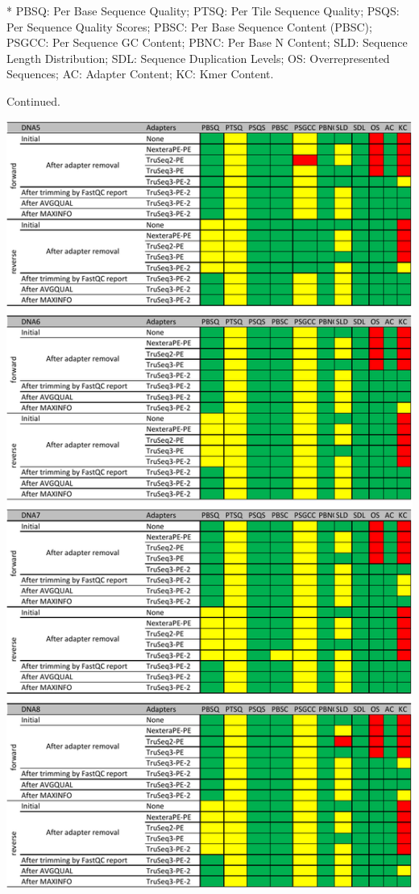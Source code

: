 \documentclass[
  oneside,
  11pt, a4paper,
  footinclude=true,
  headinclude=true,
  cleardoublepage=empty
]{scrbook}
\begin{document}
\begin{table}[ph!]
    \label{fig:trim_mg}
    \begin{tablenotes}
    \item[*] \tiny PBSQ: Per Base Sequence Quality; PTSQ: Per Tile Sequence Quality; PSQS: Per Sequence Quality Scores; PBSC: Per Base Sequence Content (PBSC); PSGCC: Per Sequence GC Content; PBNC: Per Base N Content; SLD: Sequence Length Distribution; SDL: Sequence Duplication Levels; OS: Overrepresented Sequences; AC: Adapter Content; KC: Kmer Content.
    \end{tablenotes}
    \end{table}
    
    \begin{table}[ph!] \ContinuedFloat
    \caption{Continued.}
    \includegraphics[width=\columnwidth,height=\textheight]{FiguresUndTables/Results/Preprocessing/fastqcdna5678.pdf}
    \end{table}
\end{document}

